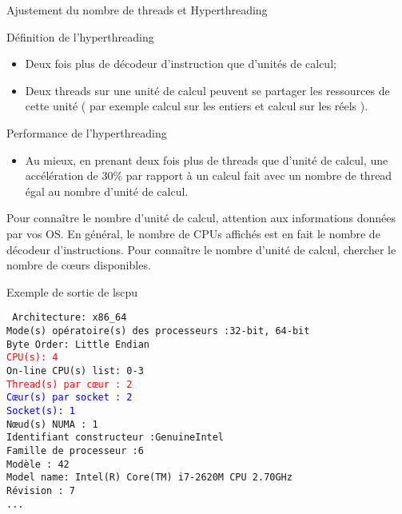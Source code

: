 \documentclass[handout,francais]{beamer}
\begin{document}
\begin{frame}[fragile]{Ajustement du nombre de threads et Hyperthreading}

\begin{block}{Définition de l'hyperthreading}
\begin{itemize}
 \item Deux fois plus de décodeur d'instruction que d'unités de calcul;
 \item Deux threads sur une unité de calcul peuvent se partager les ressources
       de cette unité ( par exemple calcul sur les entiers et calcul sur les réels ).
\end{itemize}
\end{block}


\begin{block}{Performance de l'hyperthreading}
\begin{itemize}
 \item Au mieux, en prenant deux fois plus de threads que d'unité de calcul, une accélération de 30\%
 par rapport à un calcul fait avec un nombre de thread égal au nombre d'unité de calcul.
\end{itemize}

\end{block}

\alert{Pour connaître le nombre d'unité de calcul, attention aux informations données par vos OS. En général, le nombre de CPUs affichés
est en fait le nombre de décodeur d'instructions. Pour connaître le nombre d'unité de calcul, chercher le nombre de c{\oe}urs disponibles.}

\end{frame}

\begin{frame}[fragile]{Exemple de sortie de lscpu}

\texttt{
Architecture:          x86\_64\\
Mode(s) opératoire(s) des processeurs :32-bit, 64-bit\\
Byte Order:            Little Endian\\
\textcolor{red}{CPU(s):                4}\\
On-line CPU(s) list:   0-3\\
\textcolor{red}{Thread(s) par cœur : 2}\\
\textcolor{blue}{Cœur(s) par socket : 2}\\
\textcolor{blue}{Socket(s):             1}\\
Nœud(s) NUMA :       1\\
Identifiant constructeur :GenuineIntel\\
Famille de processeur :6\\
Modèle :             42\\
Model name:            Intel(R) Core(TM) i7-2620M CPU \@ 2.70GHz\\
Révision :           7\\
...
}
\end{frame}
\end{document}

